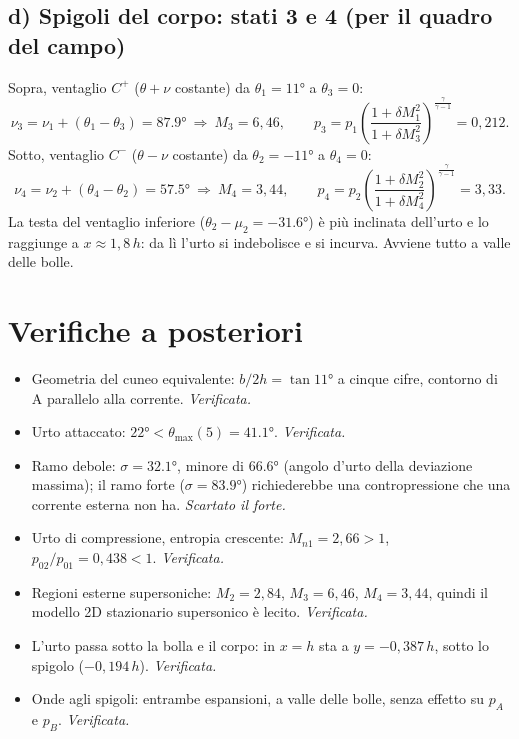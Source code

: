 \documentclass[11pt,a4paper]{article}
\newcommand{\Cp}{C^{+}}
\newcommand{\Cm}{C^{-}}
\begin{document}
\subsection*{d) Spigoli del corpo: stati 3 e 4 (per il quadro del campo)}
Sopra, ventaglio $\Cp$ ($\theta+\nu$ costante) da $\theta_1=\ang{11}$ a $\theta_3=0$:
\[
\nu_3=\nu_1+(\theta_1-\theta_3)=\ang{87.9}\ \Rightarrow\ M_3=6{,}46,\qquad
p_3=p_1\left(\frac{1+\delta M_1^2}{1+\delta M_3^2}\right)^{\frac{\gamma}{\gamma-1}}=0{,}212 .
\]
Sotto, ventaglio $\Cm$ ($\theta-\nu$ costante) da $\theta_2=\ang{-11}$ a $\theta_4=0$:
\[
\nu_4=\nu_2+(\theta_4-\theta_2)=\ang{57.5}\ \Rightarrow\ M_4=3{,}44,\qquad
p_4=p_2\left(\frac{1+\delta M_2^2}{1+\delta M_4^2}\right)^{\frac{\gamma}{\gamma-1}}=3{,}33 .
\]
La testa del ventaglio inferiore ($\theta_2-\mu_2=\ang{-31.6}$) è più inclinata dell'urto e lo raggiunge a
$x\approx1{,}8\,h$: da lì l'urto si indebolisce e si incurva. Avviene tutto a valle delle bolle.

\section{Verifiche a posteriori}
\begin{itemize}
\item Geometria del cuneo equivalente: $b/2h=\tan\ang{11}$ a cinque cifre, contorno di A parallelo alla corrente.
  \emph{Verificata.}
\item Urto attaccato: $\ang{22}<\theta_{\max}(5)=\ang{41.1}$. \emph{Verificata.}
\item Ramo debole: $\sigma=\ang{32.1}$, minore di \ang{66.6} (angolo d'urto della deviazione massima); il ramo forte ($\sigma=\ang{83.9}$)
  richiederebbe una contropressione che una corrente esterna non ha. \emph{Scartato il forte.}
\item Urto di compressione, entropia crescente: $M_{n1}=2{,}66>1$, $p_{02}/p_{01}=0{,}438<1$. \emph{Verificata.}
\item Regioni esterne supersoniche: $M_2=2{,}84$, $M_3=6{,}46$, $M_4=3{,}44$, quindi il modello 2D stazionario
  supersonico è lecito. \emph{Verificata.}
\item L'urto passa sotto la bolla e il corpo: in $x=h$ sta a $y=-0{,}387\,h$, sotto lo spigolo ($-0{,}194\,h$).
  \emph{Verificata.}
\item Onde agli spigoli: entrambe espansioni, a valle delle bolle, senza effetto su $p_A$ e $p_B$. \emph{Verificata.}
\end{itemize}
\end{document}
